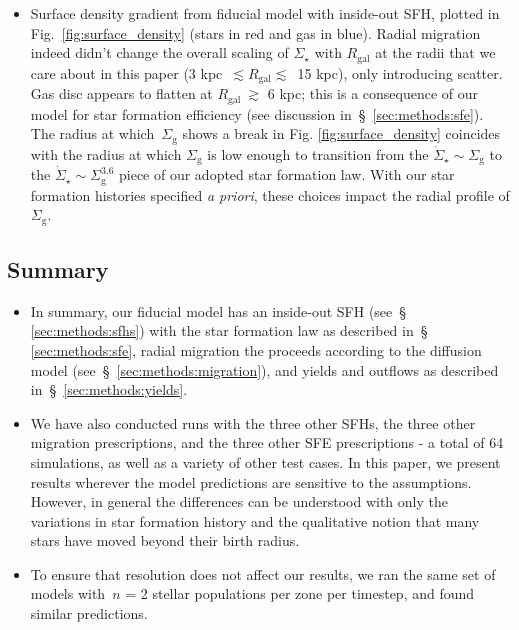 \documentclass[fleqn, usenatbib]{mnras}
\begin{document}
\begin{itemize}
	\item Surface density gradient from fiducial model with inside-out SFH, 
	plotted in Fig.~\ref{fig:surface_density} (stars in red and gas in blue). 
	Radial migration indeed didn't change the overall scaling of 
	$\Sigma_\star$ with $R_\text{gal}$ at the radii that we care about in 
	this paper (3 kpc~$\lesssim R_\text{gal} \lesssim$~15 kpc), only 
	introducing scatter. Gas disc appears to flatten at 
	$R_\text{gal}~\gtrsim$ 6 kpc; this is a consequence of our model for star 
	formation efficiency (see discussion in~\S~\ref{sec:methods:sfe}). The 
	radius at which~$\Sigma_\text{g}$ shows a break in Fig. 
	\ref{fig:surface_density} coincides with the radius at which 
	$\Sigma_\text{g}$ is low enough to transition from the 
	$\dot{\Sigma}_\star \sim \Sigma_\text{g}$ to the 
	$\dot{\Sigma}_\star \sim \Sigma_\text{g}^{3.6}$ piece of our adopted star 
	formation law. With our star formation histories specified 
	\textit{a priori}, these choices impact the radial profile of 
	$\Sigma_\text{g}$. 
\end{itemize} 

\subsection{Summary} 
\label{sec:methods:summary} 

\begin{itemize} 
	\item In summary, our fiducial model has an inside-out SFH (see~\S 
	\ref{sec:methods:sfhs}) with the star formation law as described in~\S 
	\ref{sec:methods:sfe}, radial migration the proceeds according to the 
	diffusion model (see~\S~\ref{sec:methods:migration}), and yields and 
	outflows as described in~\S~\ref{sec:methods:yields}. 

	\item We have also conducted runs with the three other SFHs, the three 
	other migration prescriptions, and the three other SFE prescriptions - a 
	total of 64 simulations, as well as a variety of other test cases. In this 
	paper, we present results wherever the model predictions are sensitive to 
	the assumptions. However, in general the differences can be understood 
	with only the variations in star formation history and the qualitative 
	notion that many stars have moved beyond their birth radius. 

	\item To ensure that resolution does not affect our results, we ran the 
	same set of models with~$n$ = 2 stellar populations per zone per 
	timestep, and found similar predictions. 
\end{itemize} 
\end{document}
